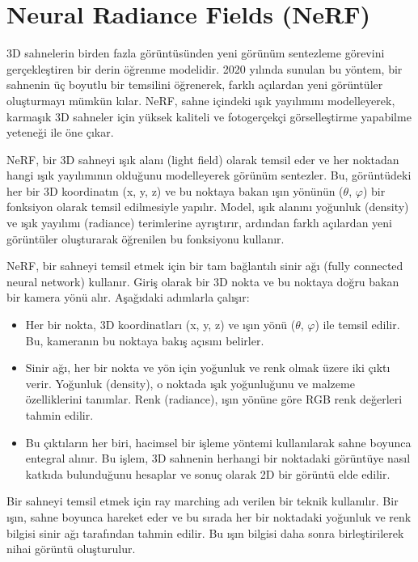 \section{Neural Radiance Fields (NeRF)}

3D sahnelerin birden fazla görüntüsünden yeni görünüm sentezleme görevini gerçekleştiren bir derin öğrenme modelidir. 2020 yılında sunulan bu yöntem, bir sahnenin üç boyutlu bir temsilini öğrenerek, farklı açılardan yeni görüntüler oluşturmayı mümkün kılar. NeRF, sahne içindeki ışık yayılımını modelleyerek, karmaşık 3D sahneler için yüksek kaliteli ve fotogerçekçi görselleştirme yapabilme yeteneği ile öne çıkar.

NeRF, bir 3D sahneyi ışık alanı (light field) olarak temsil eder ve her noktadan hangi ışık yayılımının olduğunu modelleyerek görünüm sentezler. Bu, görüntüdeki her bir 3D koordinatın (x, y, z) ve bu noktaya bakan ışın yönünün ($\theta$, $\varphi$) bir fonksiyon olarak temsil edilmesiyle yapılır. Model, ışık alanını yoğunluk (density) ve ışık yayılımı (radiance) terimlerine ayrıştırır, ardından farklı açılardan yeni görüntüler oluşturarak öğrenilen bu fonksiyonu kullanır.

NeRF, bir sahneyi temsil etmek için bir tam bağlantılı sinir ağı (fully connected neural network) kullanır. Giriş olarak bir 3D nokta ve bu noktaya doğru bakan bir kamera yönü alır. Aşağıdaki adımlarla çalışır:

\begin{itemize}
    \item Her bir nokta, 3D koordinatları (x, y, z) ve ışın yönü ($\theta$, $\varphi$) ile temsil edilir. Bu, kameranın bu noktaya bakış açısını belirler.
    \item Sinir ağı, her bir nokta ve yön için yoğunluk ve renk olmak üzere iki çıktı verir. Yoğunluk (density), o noktada ışık yoğunluğunu ve malzeme özelliklerini tanımlar. Renk (radiance), ışın yönüne göre RGB renk değerleri tahmin edilir.
    \item  Bu çıktıların her biri, hacimsel bir işleme yöntemi kullanılarak sahne boyunca entegral alınır. Bu işlem, 3D sahnenin herhangi bir noktadaki görüntüye nasıl katkıda bulunduğunu hesaplar ve sonuç olarak 2D bir görüntü elde edilir.
\end{itemize}

Bir sahneyi temsil etmek için ray marching adı verilen bir teknik kullanılır. Bir ışın, sahne boyunca hareket eder ve bu sırada her bir noktadaki yoğunluk ve renk bilgisi sinir ağı tarafından tahmin edilir. Bu ışın bilgisi daha sonra birleştirilerek nihai görüntü oluşturulur.

